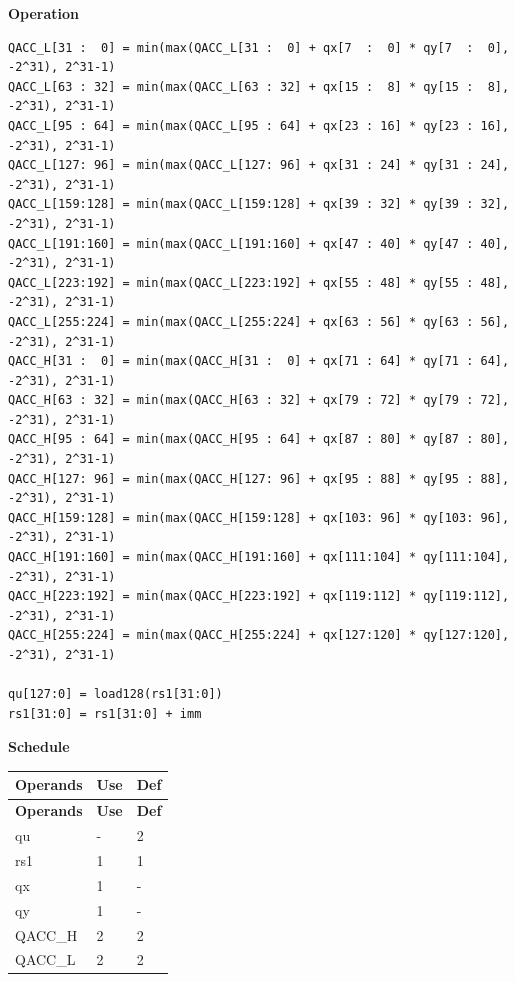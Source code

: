 \textbf{Operation}\\
\begin{lstlisting}
QACC_L[31 :  0] = min(max(QACC_L[31 :  0] + qx[7  :  0] * qy[7  :  0], -2^31), 2^31-1)
QACC_L[63 : 32] = min(max(QACC_L[63 : 32] + qx[15 :  8] * qy[15 :  8], -2^31), 2^31-1)
QACC_L[95 : 64] = min(max(QACC_L[95 : 64] + qx[23 : 16] * qy[23 : 16], -2^31), 2^31-1)
QACC_L[127: 96] = min(max(QACC_L[127: 96] + qx[31 : 24] * qy[31 : 24], -2^31), 2^31-1)
QACC_L[159:128] = min(max(QACC_L[159:128] + qx[39 : 32] * qy[39 : 32], -2^31), 2^31-1)
QACC_L[191:160] = min(max(QACC_L[191:160] + qx[47 : 40] * qy[47 : 40], -2^31), 2^31-1)
QACC_L[223:192] = min(max(QACC_L[223:192] + qx[55 : 48] * qy[55 : 48], -2^31), 2^31-1)
QACC_L[255:224] = min(max(QACC_L[255:224] + qx[63 : 56] * qy[63 : 56], -2^31), 2^31-1)
QACC_H[31 :  0] = min(max(QACC_H[31 :  0] + qx[71 : 64] * qy[71 : 64], -2^31), 2^31-1)
QACC_H[63 : 32] = min(max(QACC_H[63 : 32] + qx[79 : 72] * qy[79 : 72], -2^31), 2^31-1)
QACC_H[95 : 64] = min(max(QACC_H[95 : 64] + qx[87 : 80] * qy[87 : 80], -2^31), 2^31-1)
QACC_H[127: 96] = min(max(QACC_H[127: 96] + qx[95 : 88] * qy[95 : 88], -2^31), 2^31-1)
QACC_H[159:128] = min(max(QACC_H[159:128] + qx[103: 96] * qy[103: 96], -2^31), 2^31-1)
QACC_H[191:160] = min(max(QACC_H[191:160] + qx[111:104] * qy[111:104], -2^31), 2^31-1)
QACC_H[223:192] = min(max(QACC_H[223:192] + qx[119:112] * qy[119:112], -2^31), 2^31-1)
QACC_H[255:224] = min(max(QACC_H[255:224] + qx[127:120] * qy[127:120], -2^31), 2^31-1)

qu[127:0] = load128(rs1[31:0])
rs1[31:0] = rs1[31:0] + imm
\end{lstlisting}

\textbf{Schedule}\\
\begin{longtable}[c]{|l|l|l|}
    \hline
    \rowcolor{lightgray}
    \textbf{Operands} & \textbf{Use} & \textbf{Def} \\\hline
    \endfirsthead
    \hline
    \rowcolor{lightgray}
     \textbf{Operands} & \textbf{Use} & \textbf{Def} \\\hline
    \endhead
    \hline
    \endfoot

    qu & - & 2 \\\hline
    rs1 & 1 & 1 \\\hline
     qx & 1 & - \\\hline
     qy & 1 & - \\\hline
     QACC\_H & 2 & 2 \\\hline
     QACC\_L & 2 & 2

\end{longtable}

